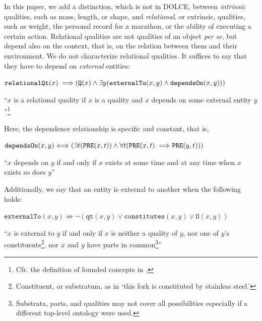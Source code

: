 \documentclass[sw]{iosart2x}
\newcommand{\bflist}{\begin{list}{}{\setlength{\topsep}{2mm}\setlength{\partopsep}{0mm}\setlength{\parsep}{0mm}\setlength{\leftmargin}{9mm}\setlength{\labelwidth}{8mm}}}
\newcommand{\eflist}{\end{list}}
\newcommand{\AxLabel}{\textrm{a}}
\newcommand{\DefLabel}{\textrm{d}}
\newcounter{cntax}
\newcommand{\myax}[1]{\refstepcounter{cntax}\begin{small}{\bf \AxLabel\thecntax\label{ax:#1}}\end{small}}
\newcounter{cntdef}
\newcommand{\mydf}[1]{\refstepcounter{cntdef}\begin{small}{\bf \DefLabel\thecntdef\label{def:#1}}\end{small}}
\newcommand{\mytext}[1]{``#1''}
\newcommand{\generalStyle}[1]{\texttt{#1}}
\newcommand{\biRel}[3]{\generalStyle{#1}(#2,#3)}
\newcommand{\uniRel}[2]{\generalStyle{#1}(#2)}
\newcommand{\myiff}{\Longleftrightarrow}
\newcommand{\myfi}{\hspace{0.9mm} \Longrightarrow}
\newcommand{\DOLCE}{\textsc{DOLCE}\xspace} %
\newcommand{\DOLCEQuality}[1]{\uniRel{Q}{#1}}
\newcommand{\DOLCEPart}[2]{\biRel{{P}}{#1}{#2}}
\newcommand{\DOLCEOver}[2]{\biRel{{O}}{#1}{#2}}
\newcommand{\DOLCEConstitutes}[2]{\biRel{{constitutes}}{#1}{#2}}
\newcommand{\DOLCEQualityDirect}[2]{\biRel{qt}{#1}{#2}}
\newcommand{\DOLCEPRE}[2]{\biRel{PRE}{#1}{#2}}
\newcommand{\RelationalQuality}[1]{\uniRel{relationalQt}{#1}}
\newcommand{\specificallyDependsOn}[2]{\biRel{dependsOn}{#1}{#2}}
\newcommand{\external}[2]{\biRel{externalTo}{#1}{#2}}
\newcommand{\internal}[2]{\biRel{internalTo}{#1}{#2}}
\newcommand{\firstTimeKeyWord}[1]{\textit{#1}}
\newcommand{\quotes}[1]{`#1'}
\newcommand{\TODO}[1]{{\color{red} #1}}
\begin{document}
In this paper, we add a distinction, which is not in \DOLCE, between \firstTimeKeyWord{intrinsic} qualities, such as mass, length, or shape, and \firstTimeKeyWord{relational}, or extrinsic, qualities, such as weight, the personal record for a marathon, or the ability of executing a certain action. 
Relational qualities are not qualities of an object \textit{per se}, but depend also on the context, that is, on the relation between them and their environment.
We do not characterize relational qualities. It suffices to say that they have to depend on \firstTimeKeyWord{external} entities: 
\bflist
  \item[\myax{relationalQtPartialDef}] $ \RelationalQuality{x} \myfi  ( \DOLCEQuality{x} \land \exists y(\external{x}{y} \land \specificallyDependsOn{x}{y}))$%
  \item[] \mytext{$x$ is a relational quality if $x$ is a quality and $x$ depends on some external entity $y$}\footnote{Cfr. the definition of founded concepts in \cite{masoloSocialRolesTheir2004}.}
\eflist
  
  Here, the dependence relationship is specific and constant, that is,
\bflist
  \item[\mydf{specificallyDependsOn}] $ \specificallyDependsOn{x}{y} \myiff (\exists t(\DOLCEPRE{x}{t}) \land \forall t(\DOLCEPRE{x}{t} \myfi \DOLCEPRE{y}{t}))$ 
  \item[] \mytext{$x$ depends on $y$ if and only if $x$ exists at some time and at any time when $x$ exists so does $y$}
\eflist
  
Additionally, we say that an entity is external to another when the following holds:
\bflist
  \item[\mydf{external}] $ \external{x}{y} \myiff \neg (\DOLCEQualityDirect{x}{y} \lor \DOLCEConstitutes{x}{y} \lor %
  \DOLCEOver{x}{y})$
  \item[] \mytext{$x$ is external to $y$ if and only if $x$ is neither a quality of $y$, nor one of $y$'s constituents\footnote{Constituent, or substratum, as in \quotes{this fork is constituted by stainless steel.}}, nor $x$ and $y$ have parts in common\footnote{Substrata, parts, and qualities may not cover all possibilities especially if a different top-level ontology were used.}}  
\eflist
\end{document}
